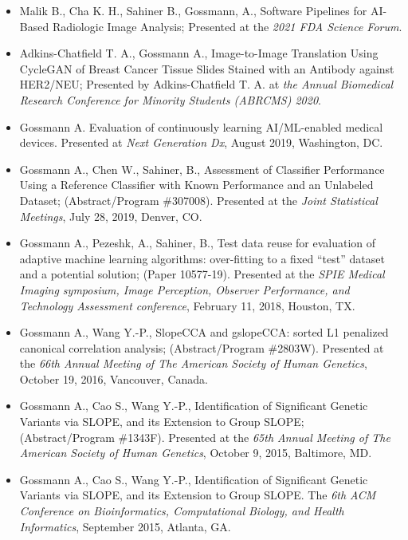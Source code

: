 \documentclass[overlapped, line, 10pt]{res} %
\begin{document}
\begin{resume}
\begin{itemize}
  \item
    Malik B., Cha K. H., Sahiner B., Gossmann, A., Software Pipelines for AI-Based Radiologic Image Analysis;
    Presented at the \textit{2021 FDA Science Forum}.
  \item 
    Adkins-Chatfield T. A., Gossmann A., Image-to-Image Translation Using CycleGAN of Breast Cancer Tissue Slides Stained with an Antibody against HER2/NEU;
    Presented by Adkins-Chatfield T. A. at \textit{the Annual Biomedical Research Conference for Minority Students (ABRCMS) 2020}.
  \item 
    Gossmann A. Evaluation of continuously learning AI/ML-enabled medical devices.
    Presented at \textit{Next Generation Dx},
    August 2019, Washington, DC.
  \item
    Gossmann A., Chen W., Sahiner, B., Assessment of Classifier Performance Using a Reference Classifier with Known Performance and an Unlabeled Dataset;
    (Abstract/Program \#307008).
    Presented at the \textit{Joint Statistical Meetings},
    July 28, 2019, Denver, CO.
  \item
    Gossmann A., Pezeshk, A., Sahiner, B., Test data reuse for evaluation of adaptive machine learning algorithms: over-fitting to a fixed ``test'' dataset and a potential solution;
    (Paper 10577-19).
    Presented at the \textit{SPIE Medical Imaging symposium, Image Perception, Observer Performance, and Technology Assessment conference},
    February 11, 2018, Houston, TX.
  \item
    Gossmann A., Wang Y.-P., SlopeCCA and gslopeCCA: sorted L1 penalized canonical correlation analysis;
    (Abstract/Program \#2803W).
    Presented at the \textit{66th Annual Meeting of The American Society of Human Genetics},
    October 19, 2016, Vancouver, Canada.
  \item
    Gossmann A., Cao S., Wang Y.-P., Identification of Significant Genetic Variants via SLOPE, and its Extension to Group SLOPE;
    (Abstract/Program \#1343F).
    Presented at the \textit{65th Annual Meeting of The American Society of Human Genetics},
    October 9, 2015, Baltimore, MD.
  \item
    Gossmann A., Cao S., Wang Y.-P., Identification of Significant Genetic Variants via SLOPE, and its Extension to Group SLOPE.
    The \textit{6th ACM Conference on Bioinformatics, Computational Biology, and Health Informatics},
    September 2015, Atlanta, GA.
\end{itemize}


\end{resume}
\end{document}
